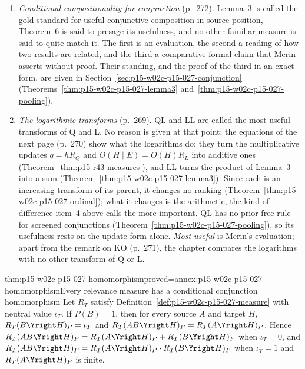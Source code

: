 \begin{enumerate}
  instruction sheet should warrant a skewed prior before the observation.
  This premise is what makes the even prior odds of
  Section~\ref{sec:p15-w02c-p15-027-base-rate} a neglect; it is stated,
  not argued.
\item \emph{Conditional compositionality for conjunction} (p.~272). Lemma~3
  is called the gold standard for useful conjunctive composition in
  source position, Theorem~6 is said to presage its usefulness, and no
  other familiar measure is said to quite match it. The first is an
  evaluation, the second a reading of how two results are related, and
  the third a comparative formal claim that Merin asserts without proof.
  Their standing, and the proof of the third in an exact form, are given
  in Section~\ref{sec:p15-w02c-p15-027-conjunction}
  (Theorems~\ref{thm:p15-w02c-p15-027-lemma3}
  and~\ref{thm:p15-w02c-p15-027-pooling}).
\item \emph{The logarithmic transforms} (p.~269). QL and LL are called
  the most useful transforms of Q and L. No reason is given at that
  point; the equations of the next page (p.~270) show what the
  logarithms do: they turn the multiplicative updates
  \(q=hR_Q\) and \(O(H\mid E)=O(H)R_L\) into additive ones
  (Theorem~\ref{thm:p15-r43-measures}), and LL turns the product of
  Lemma~3 into a sum (Theorem~\ref{thm:p15-w02c-p15-027-lemma3}). Since
  each is an increasing transform of its parent, it changes no ranking
  (Theorem~\ref{thm:p15-w02c-p15-027-ordinal}); what it changes is the
  arithmetic, the kind of difference item~4 above calls the more
  important. QL has no prior-free rule for screened conjunctions
  (Theorem~\ref{thm:p15-w02c-p15-027-pooling}), so its usefulness rests on
  the update form alone. \emph{Most useful} is Merin's evaluation; apart
  from the remark on KO (p.~271), the chapter compares the logarithms
  with no other transform of Q or L.
\end{enumerate}

\begin{hbtheorem}{thm:p15-w02c-p15-027-homomorphism}{proved=annex:p15-w02c-p15-027-homomorphism}{Every relevance measure has a conditional conjunction homomorphism}
Let \(R_T\) satisfy Definition~\ref{def:p15-w02c-p15-027-measure} with
neutral value \(\iota_T\). If \(P(B)=1\), then for every source \(A\)
and target \(H\), \(R_T(B\Yright H)_P=\iota_T\) and
\(R_T(AB\Yright H)_P=R_T(A\Yright H)_P\). Hence
\(R_T(AB\Yright H)_P=R_T(A\Yright H)_P+R_T(B\Yright H)_P\) when
\(\iota_T=0\), and
\(R_T(AB\Yright H)_P=R_T(A\Yright H)_P\cdot R_T(B\Yright H)_P\) when
\(\iota_T=1\) and \(R_T(A\Yright H)_P\) is finite.
\end{hbtheorem}

